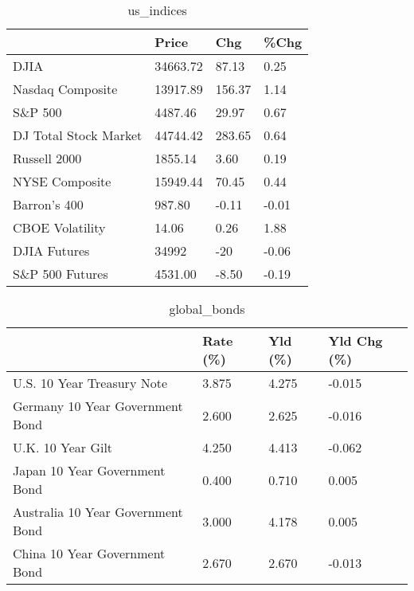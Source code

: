 \documentclass{article}%
\begin{document}
%


\begin{table}[htbp]%
\caption{us\_indices}%
\centering%
\begin{adjustbox}{width=1\textwidth}%
\begin{tabular}{llll}
\toprule
                      &    Price &    Chg &  \%Chg \\
\midrule
                 DJIA & 34663.72 &  87.13 &  0.25 \\
     Nasdaq Composite & 13917.89 & 156.37 &  1.14 \\
              S\&P 500 &  4487.46 &  29.97 &  0.67 \\
DJ Total Stock Market & 44744.42 & 283.65 &  0.64 \\
         Russell 2000 &  1855.14 &   3.60 &  0.19 \\
       NYSE Composite & 15949.44 &  70.45 &  0.44 \\
         Barron's 400 &   987.80 &  -0.11 & -0.01 \\
      CBOE Volatility &    14.06 &   0.26 &  1.88 \\
         DJIA Futures &    34992 &    -20 & -0.06 \\
      S\&P 500 Futures &  4531.00 &  -8.50 & -0.19 \\
\bottomrule
\end{tabular}
%
\end{adjustbox}%
\end{table}

%


\begin{table}[htbp]%
\caption{global\_bonds}%
\centering%
\begin{adjustbox}{width=1\textwidth}%
\begin{tabular}{llll}
\toprule
                                  & Rate (\%) & Yld (\%) & Yld Chg (\%) \\
\midrule
       U.S. 10 Year Treasury Note &    3.875 &   4.275 &      -0.015 \\
  Germany 10 Year Government Bond &    2.600 &   2.625 &      -0.016 \\
                U.K. 10 Year Gilt &    4.250 &   4.413 &      -0.062 \\
    Japan 10 Year Government Bond &    0.400 &   0.710 &       0.005 \\
Australia 10 Year Government Bond &    3.000 &   4.178 &       0.005 \\
    China 10 Year Government Bond &    2.670 &   2.670 &      -0.013 \\
\bottomrule
\end{tabular}
%
\end{adjustbox}%
\end{table}
\end{document}
